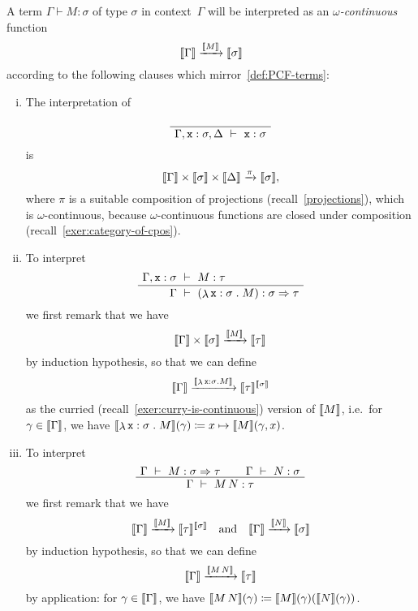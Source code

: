 \begin{definition}\label{def:interpretation}
  A term \(\Gamma \vdash M : \sigma\) of type \(\sigma\) in context~\(\Gamma\)
  will be interpreted as an \emph{\(\omega\)-continuous} function
  \[
    \llbracket\Gamma\rrbracket \xrightarrow{\llbracket M\rrbracket} \llbracket\sigma\rrbracket
  \]
  according to the following clauses which mirror~\cref{def:PCF-terms}:
  \begin{enumerate}[(i)]
  \item
    The interpretation of
    \[
      \def\fCenter{\ \vdash\ }
      \AxiomC{\phantom{$\fCenter$}}
      \UnaryInf$\Gamma,\var{x}:\sigma,\Delta \fCenter \var{x} : \sigma$
      \DisplayProof
    \]
    is
    \[
      \llbracket\Gamma\rrbracket \times \llbracket\sigma\rrbracket \times {\llbracket\Delta\rrbracket}
      \xrightarrow{\pi} \llbracket\sigma\rrbracket,
    \]
    where \(\pi\) is a suitable composition of projections
    (recall~\cref{projections}), which is \(\omega\)-continuous, because
    \(\omega\)-continuous functions are closed under composition
    (recall~\cref{exer:category-of-cpos}).
  \item
    To interpret
    \[
      \def\fCenter{\ \vdash\ }
      \Axiom$\Gamma , \var{x} : \sigma \fCenter M : \tau$
      \UnaryInf$\Gamma \fCenter (\lambdadot{\var{x} : \sigma}{M}) : \sigma
      \pcffun \tau$ \DisplayProof
    \]
    we first remark that we have
    \[
      \llbracket\Gamma\rrbracket \times \llbracket\sigma\rrbracket \xrightarrow{\llbracket M\rrbracket} \llbracket\tau\rrbracket
    \]
    by induction hypothesis, so that we can define
    \[
      \llbracket\Gamma\rrbracket \xrightarrow{\llbracket\mathop{\lambda}{\mathtt x : \sigma}\mathrel{.}M\rrbracket}
      \llbracket\tau\rrbracket^{\llbracket\sigma\rrbracket}
    \]
    as the curried (recall~\cref{exer:curry-is-continuous}) version of
    \(\llbracket M\rrbracket\), i.e.\ for \(\gamma \in \llbracket\Gamma\rrbracket\), we have
    \(\llbracket\mathop{\lambda}{\mathtt x : \sigma}\mathrel{.}M\rrbracket(\gamma) \coloneqq x \mapsto
    \llbracket M\rrbracket(\gamma,x)\).
  \item
    To interpret
    \[
      \def\fCenter{\ \vdash\ }
      \Axiom$\Gamma \fCenter M : \sigma \pcffun \tau$
      \Axiom$\Gamma \fCenter N : \sigma$
      \BinaryInf$\Gamma \fCenter M \, N : \tau$
      \DisplayProof
    \]
    we first remark that we have
    \[
      \llbracket\Gamma\rrbracket \xrightarrow{\llbracket M\rrbracket} \llbracket\tau\rrbracket^{\llbracket\sigma\rrbracket}
      \quad\text{and}\quad
      \llbracket\Gamma\rrbracket \xrightarrow{\llbracket N\rrbracket} \llbracket\sigma\rrbracket
    \]
    by induction hypothesis, so that we can define
    \[
      \llbracket\Gamma\rrbracket \xrightarrow{\llbracket M \, N\rrbracket} \llbracket\tau\rrbracket
    \]
    by application: for \(\gamma \in \llbracket\Gamma\rrbracket\), we have
    \(\densem{M \, N}(\gamma) \coloneqq
    \densem{M}(\gamma)\pa*{\densem{N}(\gamma)}\).


\end{enumerate}
\end{definition}
